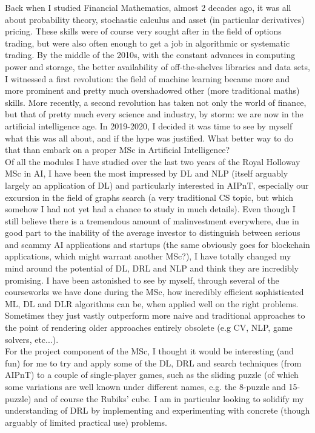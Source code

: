 Back when I studied Financial Mathematics, almost 2 decades ago, it was all about probability theory, stochastic calculus and asset (in particular derivatives) pricing. These skills were of course very sought after in the field of options trading, but were also often enough to get a job in algorithmic or systematic trading. By the middle of the 2010s, with the constant advances in computing power and storage, the better availability of off-the-shelves libraries and data sets, I witnessed a first revolution: the field of machine learning became more and more prominent and pretty much overshadowed other (more traditional maths) skills. More recently, a  second revolution has taken not only the world of finance, but that of pretty much every science and industry, by storm: we are now in the artificial intelligence age.
In 2019-2020, I decided it was time to see by myself what this was all about, and if the hype was justified. What better way to do that than embark on a proper MSc in Artificial Intelligence?
\\
Of all the modules I have studied over the last two years of the Royal Holloway MSc in AI, I have been the most impressed by DL and  NLP (itself arguably largely an application of DL) and particularly interested in AIPnT, especially our excursion in the field of graphs search (a very traditional CS topic, but which somehow I had not yet had a chance to study in much details). Even though I still believe there is a tremendous amount of malinvestment  everywhere, due in good part to the inability of the average investor to distinguish between serious and scammy AI applications and startups (the same obviously goes for blockchain applications, which might warrant another MSc?), I have totally changed my mind around the potential of DL, DRL and NLP and think they are incredibly promising. I have been astonished to see by myself, through several of the courseworks we have done during the MSc, how incredibly efficient sophisticated ML, DL and DLR algorithms can be, when applied well on the right problems. Sometimes they just vastly outperform more naive and traditional approaches to the point of rendering older approaches entirely obsolete (e.g CV, NLP, game solvers, etc...).
\\
For the project component of the MSc, I thought it would be interesting (and fun) for me to try and apply some of the DL, DRL and search techniques (from AIPnT) to a couple of single-player games, such as the sliding puzzle (of which some variations are well known under different names, e.g. the 8-puzzle and 15-puzzle) and of course the Rubiks' cube. I am in particular looking to solidify my understanding of DRL by  implementing and experimenting with concrete (though arguably of limited practical use) problems.

